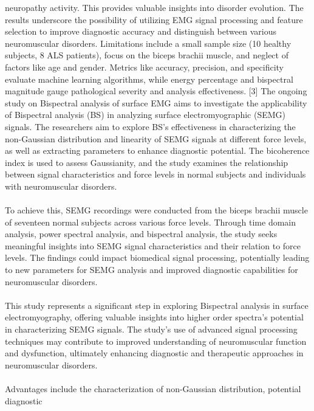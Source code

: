 \documentclass[ 12pt,a4paper,twocolumn,fleqn]{report}
\begin{document}
neuropathy activity. This provides valuable insights into disorder evolution. The results underscore the possibility of utilizing EMG signal processing and feature selection to improve diagnostic accuracy and distinguish between various neuromuscular disorders. Limitations include a small sample size (10 healthy
subjects, 8 ALS patients), focus on the biceps brachii muscle, and neglect of factors like age and gender.
Metrics like accuracy, precision, and specificity evaluate machine learning algorithms, while energy
percentage and bispectral magnitude gauge pathological severity and analysis effectiveness. [3]
\newpage
  \pagestyle{fancy}
\thisfancypage{%
  \setlength{\fboxsep}{20pt}\doublebox}{}
\normalsize
The ongoing study on Bispectral analysis of surface EMG aims to investigate the applicability of
Bispectral analysis (BS) in analyzing surface electromyographic (SEMG) signals. The researchers aim
to explore BS's effectiveness in characterizing the non-Gaussian distribution and linearity of SEMG
signals at different force levels, as well as extracting parameters to enhance diagnostic potential. The
bicoherence index is used to assess Gaussianity, and the study examines the relationship between signal
characteristics and force levels in normal subjects and individuals with neuromuscular disorders.
\\
\hfill
\\
To achieve this, SEMG recordings were conducted from the biceps brachii muscle of seventeen normal
subjects across various force levels. Through time domain analysis, power spectral analysis, and
bispectral analysis, the study seeks meaningful insights into SEMG signal characteristics and their
relation to force levels. The findings could impact biomedical signal processing, potentially leading to
new parameters for SEMG analysis and improved diagnostic capabilities for neuromuscular disorders.
\\
\hfill
\\
This study represents a significant step in exploring Bispectral analysis in surface electromyography,
offering valuable insights into higher order spectra's potential in characterizing SEMG signals. The
study's use of advanced signal processing techniques may contribute to improved understanding of
neuromuscular function and dysfunction, ultimately enhancing diagnostic and therapeutic approaches
in neuromuscular disorders.
\\
\hfill
\\
Advantages include the characterization of non-Gaussian distribution, potential diagnostic
\end{document}
